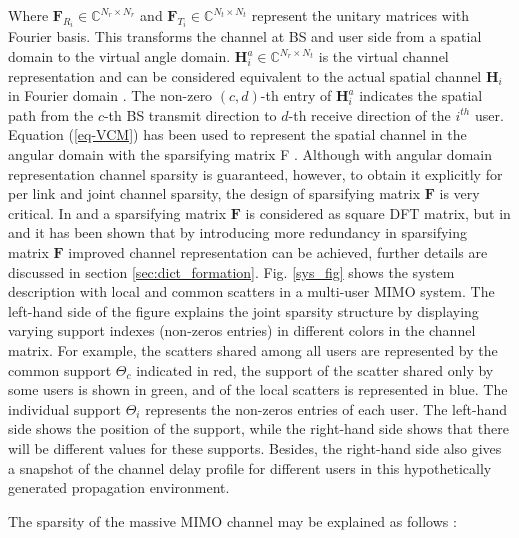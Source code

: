  Where $\mathbf{F}_{R_i}\in \mathbb{C}^{N_r\times N_r}$ and $\mathbf{F}_{T_i}\in \mathbb{C}^{N_t\times N_t}$ represent the unitary  matrices with Fourier basis. This transforms the channel at BS and user side from a spatial domain to the virtual angle domain.
$\mathbf{H}_i^a \in \mathbb{C}^{N_r\times N_t}$ is the virtual channel representation and can be considered equivalent to the actual spatial channel $\mathbf{{H}}_i$ in Fourier domain \cite{exp-vitual}. The non-zero $(c,d)$-th entry of $\mathbf{{H}}_i^a $ indicates the spatial path from the $c$-th BS transmit direction to $d$-th receive direction of the $i^{th}$ user.
 Equation (\ref{eq-VCM}) has been used to represent the spatial channel in the angular domain with the sparsifying matrix F  \cite{mainref-joint,Dict_learning}. Although with angular domain representation channel sparsity is guaranteed, however, to obtain it explicitly for per link and joint channel sparsity, the design of sparsifying matrix $\mathbf{F}$ is very critical. In \cite{mainref-joint} and \cite{mainref-1bit} a sparsifying matrix $\mathbf{F}$ is considered as square DFT matrix, but in \cite{Dict_learning} and \cite{ourwork} it has been shown that by introducing more redundancy in sparsifying matrix $\mathbf{F}$ improved channel representation can be achieved, further details are discussed in section \ref{sec:dict_formation}.  
Fig. \ref{sys_fig} shows the system description with local and common scatters in a multi-user MIMO system. The left-hand side of the figure explains the joint sparsity structure by displaying varying support indexes (non-zeros entries) in different colors in the channel matrix. For example, the scatters shared among all users are represented by the common support $\Theta_c$ indicated in red, the support of the scatter shared only by some users is shown in green, and of the local scatters is represented in blue. The individual support $\Theta_i$ represents the non-zeros entries of each user. The left-hand side shows the position of the support, while the right-hand side shows that there will be different values for these supports. Besides, the right-hand side also gives a snapshot of the channel delay profile for different users in this hypothetically generated propagation environment.

The sparsity of the massive MIMO channel may be explained as follows \cite{mainref-joint,mainref-1bit,book_enrico}: 

